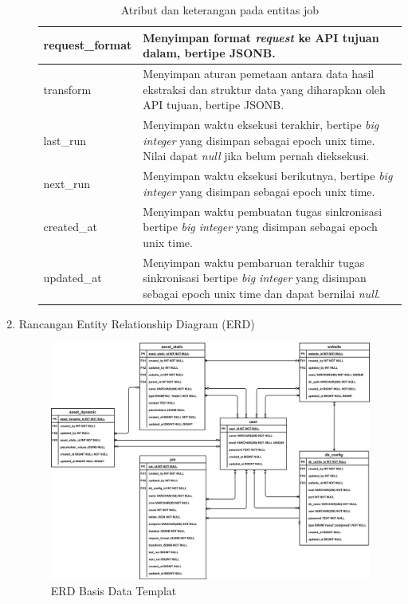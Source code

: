 \begin{enumerate}[label*=\arabic*.,ref=\arabic*]
\begin{enumerate}[label=\arabic*.]
\begin{table}[H]
\begin{tabular}{|p{3.25cm}|p{8cm}|}
                request\_format                    & Menyimpan format \textit{request} ke API tujuan dalam, bertipe JSONB. \\ \hline
                transform                          & Menyimpan aturan pemetaan antara data hasil ekstraksi dan struktur data yang diharapkan oleh API tujuan, bertipe JSONB. \\ \hline
                last\_run                          & Menyimpan waktu eksekusi terakhir, bertipe \textit{big integer} yang disimpan sebagai epoch unix time. Nilai dapat \textit{null} jika belum pernah dieksekusi. \\ \hline
                next\_run                          & Menyimpan waktu eksekusi berikutnya, bertipe \textit{big integer} yang disimpan sebagai epoch unix time. \\ \hline
                created\_at                        & Menyimpan waktu pembuatan tugas sinkronisasi bertipe \textit{big integer} yang disimpan sebagai epoch unix time. \\ \hline
                updated\_at                        & Menyimpan waktu pembaruan terakhir tugas sinkronisasi bertipe \textit{big integer} yang disimpan sebagai epoch unix time dan dapat bernilai \textit{null}. \\ \hline
            \end{tabular}
            \caption{Atribut dan keterangan pada entitas job}
            \label{tab:job_entity}
        \end{table}

\end{enumerate}


    \item Rancangan Entity Relationship Diagram (ERD)
        \begin{figure}[H]
            \centering
            \includegraphics[width=0.8\linewidth]{figures/ERD-10.png}
            \caption{ERD Basis Data Templat}
            \label{fig:ERD-GeneratorKontenWebsite}
        \end{figure}

\end{enumerate}